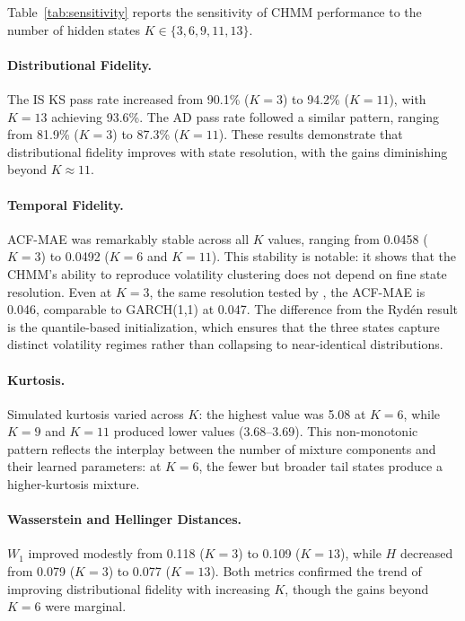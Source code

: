 Table~\ref{tab:sensitivity} reports the sensitivity of CHMM performance to the number of hidden states $K \in \{3, 6, 9, 11, 13\}$.

\paragraph{Distributional Fidelity.}
The IS KS pass rate increased from 90.1\% ($K = 3$) to 94.2\% ($K = 11$), with $K = 13$ achieving 93.6\%.
The AD pass rate followed a similar pattern, ranging from 81.9\% ($K = 3$) to 87.3\% ($K = 11$).
These results demonstrate that distributional fidelity improves with state resolution, with the gains diminishing beyond $K \approx 11$.

\paragraph{Temporal Fidelity.}
ACF-MAE was remarkably stable across all $K$ values, ranging from 0.0458 ($K = 3$) to 0.0492 ($K = 6$ and $K = 11$).
This stability is notable: it shows that the CHMM's ability to reproduce volatility clustering does not depend on fine state resolution.
Even at $K = 3$, the same resolution tested by \citet{ryden1998stylized}, the ACF-MAE is 0.046, comparable to GARCH(1,1) at 0.047.
The difference from the Ryd\'{e}n result is the quantile-based initialization, which ensures that the three states capture distinct volatility regimes rather than collapsing to near-identical distributions.

\paragraph{Kurtosis.}
Simulated kurtosis varied across $K$: the highest value was 5.08 at $K = 6$, while $K = 9$ and $K = 11$ produced lower values (3.68--3.69).
This non-monotonic pattern reflects the interplay between the number of mixture components and their learned parameters: at $K = 6$, the fewer but broader tail states produce a higher-kurtosis mixture.

\paragraph{Wasserstein and Hellinger Distances.}
$W_1$ improved modestly from 0.118 ($K = 3$) to 0.109 ($K = 13$), while $H$ decreased from 0.079 ($K = 3$) to 0.077 ($K = 13$).
Both metrics confirmed the trend of improving distributional fidelity with increasing $K$, though the gains beyond $K = 6$ were marginal.


